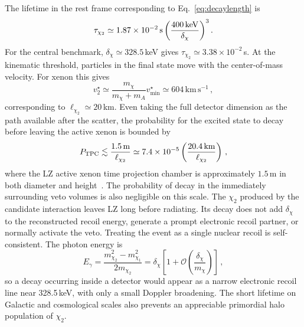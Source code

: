 \documentclass[aps,prd,reprint,preprintnumbers,superscriptaddress,nofootinbib,floatfix]{revtex4-2}
\newcommand{\dchi}{\delta_\chi}
\newcommand{\kms}{\,\mathrm{km\,s^{-1}}}
\begin{document}
The lifetime in the rest frame corresponding to Eq.~\eqref{eq:decaylength} is
\begin{equation}
    \label{eq:lifetime}
    \tau_{\chi_2}\simeq1.87\times10^{-2}\,\mathrm{s}\left(\frac{400{\rm\,keV}}{\dchi}\right)^3.
\end{equation}
For the central benchmark, $\dchi\simeq328.5$\,keV gives $\tau_{\chi_2}\simeq3.38\times10^{-2}$\,s. At the kinematic threshold, particles in the final state move with the center-of-mass velocity. For xenon this gives
\begin{equation}
    \label{eq:v2star}
    v_2^\star\simeq\frac{m_\chi}{m_\chi+m_A}v_{\min}^\star\simeq604\kms\,,
\end{equation}
corresponding to $\ell_{\chi_2}\simeq20$\,km. Even taking the full detector dimension as the path available after the scatter, the probability for the excited state to decay before leaving the active xenon is bounded by
\begin{equation}
    \label{eq:ptpc}
    P_{\rm TPC}\lesssim\frac{1.5\,\mathrm{m}}{\ell_{\chi_2}} \simeq7.4\times10^{-5}\left(\frac{20.4\,\mathrm{km}}{\ell_{\chi_2}}\right)\,,
\end{equation}
where the LZ active xenon time projection chamber is approximately $1.5$\,m in both diameter and height~\cite{LZ:2019sgr}. The probability of decay in the immediately surrounding veto volumes is also negligible on this scale. The $\chi_2$ produced by the candidate interaction leaves LZ long before radiating. Its decay does not add $\dchi$ to the reconstructed recoil energy, generate a prompt electronic recoil partner, or normally activate the veto. Treating the event as a single nuclear recoil is self-consistent. The photon energy is
\begin{equation}
    \label{eq:egamma}
    E_\gamma=\frac{m_{\chi_2}^2-m_{\chi_1}^2}{2m_{\chi_2}}=\dchi\left[1+\mathcal O\!\left(\frac{\dchi}{m_\chi}\right)\right]\,,
\end{equation}
so a decay occurring inside a detector would appear as a narrow electronic recoil line near 328.5\,keV, with only a small Doppler broadening. The short lifetime on Galactic and cosmological scales also prevents an appreciable primordial halo population of $\chi_2$.
\end{document}
